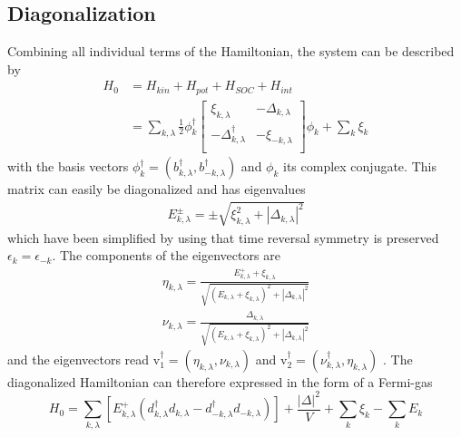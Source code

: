 \subsection{Diagonalization}
Combining all individual terms of the Hamiltonian, the system can be described by
\begin{align}
        H_0 &= H_{kin} + H_{pot}+ H_{SOC} + H_{int} \nonumber\\
        &= \label{eq:hamiltonian0matrix} \sum_{k, \lambda} \frac{1}{2} \phi_{k}^{\dag} 
        \left[ {\begin{array}{cc}
            \xi_{k,\lambda} & -\Delta_{k, \lambda} \\
          -\Delta^{\dag}_{k, \lambda} & -\xi_{-k,\lambda} \\
        \end{array} } 
        \right] 
    \phi_{k} + \sum_k \xi_k %
\end{align}
with the basis vectors $\phi^{\dag}_k = ( b^{\dag}_{k,\lambda}, b^{\dag}_{-k,\lambda})$ and $\phi_k$ its complex conjugate. \newline
This matrix can easily be diagonalized and has eigenvalues 
\begin{align}
    E^{\pm}_{k,\lambda} = \pm \sqrt{\xi^2_{k,\lambda} + |\Delta_{k, \lambda}|^2} %
\end{align}
which have been simplified by using that time reversal symmetry is preserved $\epsilon_k = \epsilon_{-k}$.\newline 
The components of the eigenvectors are 
\begin{align}
    \eta_{k,\lambda} = \frac{E^+_{k,\lambda} + \xi_{k,\lambda}}{\sqrt{(E_{k,\lambda} + \xi_{k,\lambda})^2+|\Delta_{k, \lambda}|^2}} \\
    \nu_{k,\lambda} = \frac{\Delta_{k, \lambda}}{\sqrt{(E_{k,\lambda} + \xi_{k,\lambda})^2+|\Delta_{k, \lambda}|^2}}
\end{align}
and the eigenvectors read $\text{v}^{\dag}_1 = (\eta_{k,\lambda}, \nu_{k,\lambda})$ and $\text{v}^{\dag}_2 = (\nu^{\dag}_{k,\lambda}, \eta_{k,\lambda})$ \cite{ghanbari_rkky_nodate}. \newline
The diagonalized Hamiltonian can therefore expressed in the form of a Fermi-gas
\begin{equation}\label{eq:hamiltonian0diag}
    H_0 = \sum_{k, \lambda} \left[ E^{+}_{k, \lambda} (d^{\dag}_{k,\lambda}d_{k,\lambda}-d^{\dag}_{-k,\lambda}d_{-k,\lambda} )\right]  +  \frac{|\Delta|^2}{V} +\sum_k \xi_k - \sum_k E_k %
\end{equation}
